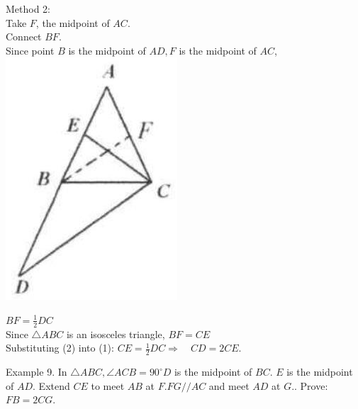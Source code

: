\documentclass[10pt]{article}
\begin{document}
Method 2:\\
Take \(F\), the midpoint of \(A C\).\\
Connect \(B F\).\\
Since point \(B\) is the midpoint of \(A D, F\) is the midpoint of \(A C\),\\
\includegraphics[max width=\textwidth, center]{2025_04_17_97bc1f7e44d93c271a88g-039(2)}

\(B F=\frac{1}{2} D C\)\\
Since \(\triangle A B C\) is an isosceles triangle, \(B F=C E\)\\
Substituting (2) into (1): \(C E=\frac{1}{2} D C \Rightarrow \quad C D=2 C E\).

Example 9. In \(\triangle A B C, \angle A C B=90^{\circ} D\) is the midpoint of \(B C\). \(E\) is the midpoint of \(A D\). Extend \(C E\) to meet \(A B\) at \(F . F G / / A C\) and meet \(A D\) at \(G\).. Prove: \(F B=2 C G\).
\end{document}
